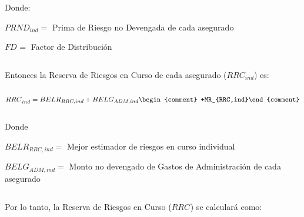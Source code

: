\documentclass[11pt,twoside,openright,spanish]{report}
\numberwithin{equation}{chapter}
\numberwithin{figure}{chapter}
\numberwithin{table}{chapter}
\begin{document}
	 

$ $

 
	
	Donde:
	
	 
		
	
	$PRND_{ind}=$ Prima de Riesgo no Devengada de cada asegurado
	
	$FD_{}^{}=$ Factor de Distribución
	
		\begin{comment}
	$PTND_{ind}=$ Prima de Tarifa no Devengada de cada asegurado
	

	$FS_{BEL}^{RRC}=$ Factor de Siniestralidad última con información de mercado
	\end{comment}
	
	 

$ $

 
	
	Entonces la Reserva de Riesgos en Curso de cada asegurado ($RRC_{ind}$) es:
	
	 

$ $

 
	
	{\centering
		${RRC}_{ind}^{}={{BELR}_{RRC,ind}+BELG_{ADM,ind} \begin{comment} +MR_{RRC,ind}\end{comment}
		}$
			
			
			
		\noindent
		
	}	
	
	
	 

$ $

 
	
	Donde
	
	 
	
	$BELR_{RRC,ind}=$ Mejor estimador de riesgos en curso individual
	
	$BELG_{ADM,ind}^{}=$ Monto no devengado de Gastos de Administración de cada asegurado
	
	\begin{comment}
	$MR_{RRC,ind}^{}=$ Margen de Riesgo de la reserva de riesgos en curso calculado anteriormente
	\end{comment}
	
	 

$ $

 
	
	Por lo tanto, la Reserva de Riesgos en Curso ($RRC_{}$) se calculará como:
	
	 

$ $

 
	
\end{document}
